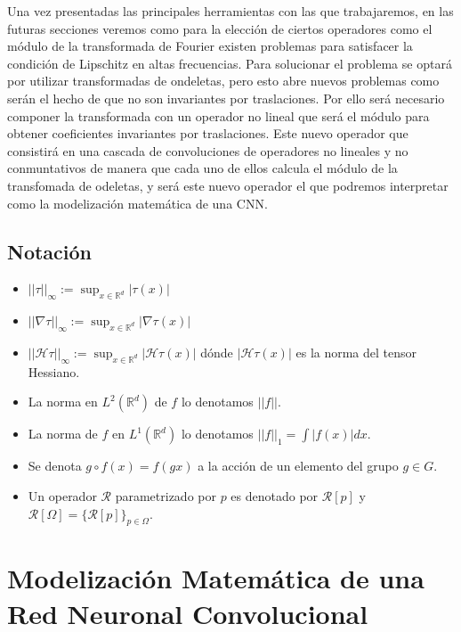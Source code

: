 \medskip


\noindent Una vez presentadas las principales herramientas con las que trabajaremos, en las futuras secciones veremos como para la elección de ciertos operadores como el módulo de la transformada de Fourier existen problemas para satisfacer la condición de Lipschitz en altas frecuencias. Para solucionar el problema se optará por utilizar transformadas de ondeletas, pero esto abre nuevos problemas como serán el hecho de que no son invariantes por traslaciones. Por ello será necesario componer la transformada con un operador no lineal que será el módulo para obtener coeficientes invariantes por traslaciones. Este nuevo operador que consistirá en una cascada de convoluciones de operadores no lineales y no conmuntativos de manera que cada uno de ellos calcula el módulo de la transfomada de odeletas, y será este nuevo operador el que podremos interpretar como la modelización matemática de una CNN.

\subsection{Notación}

\begin{itemize}
    \item $|| \tau ||_\infty := \sup_{x \in \mathbb{R}^d} |\tau(x)|$
    \item $||\nabla \tau ||_\infty := \sup_{x \in \mathbb{R}^d} |\nabla \tau(x)|$
    \item $||\mathcal{H} \tau ||_\infty := \sup_{x \in \mathbb{R}^d} |\mathcal{H} \tau(x)|$ dónde $|\mathcal{H} \tau(x)|$ es la norma del tensor Hessiano. 
    \item La norma en $L^2(\mathbb{R}^d)$ de $f$ lo denotamos $||f||$.
    \item La norma de $f$ en $L^1(\mathbb{R}^d)$ lo denotamos $||f||_1=\int{|f(x)| dx}$.
    \item Se denota $g \circ f(x)=f(gx)$ a la acción de un elemento del grupo $g\in G$.
    \item Un operador  $\mathcal{R}$ parametrizado por $p$ es denotado por $\mathcal{R}[p]$ y $\mathcal{R}[\Omega]=\lbrace \mathcal{R}[p] \rbrace_{p \in \Omega}$. 
\end{itemize}

\section{Modelización Matemática de una Red Neuronal Convolucional} \label{ch:seccion12}


